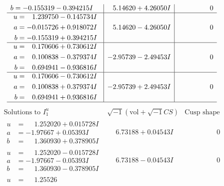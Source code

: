 \documentclass[1p]{elsarticle_modified}
\theoremstyle{definition}
\newcommand{\I}{\sqrt{-1}}
\begin{document}
$$\begin{array}{c|c|c}
\begin{aligned}
b &= -0.155319 - 0.394215 I\end{aligned}
 & \phantom{-}5.14620 + 4.26050 I & \phantom{-0.000000 } 0 \\ \hline\begin{aligned}
u &= \phantom{-}1.239750 - 0.145734 I \\
a &= -0.015726 + 0.918072 I \\
b &= -0.155319 + 0.394215 I\end{aligned}
 & \phantom{-}5.14620 - 4.26050 I & \phantom{-0.000000 } 0 \\ \hline\begin{aligned}
u &= \phantom{-}0.170606 + 0.730612 I \\
a &= \phantom{-}0.100838 - 0.379374 I \\
b &= \phantom{-}0.694941 - 0.936816 I\end{aligned}
 & -2.95739 - 2.49453 I & \phantom{-0.000000 } 0 \\ \hline\begin{aligned}
u &= \phantom{-}0.170606 - 0.730612 I \\
a &= \phantom{-}0.100838 + 0.379374 I \\
b &= \phantom{-}0.694941 + 0.936816 I\end{aligned}
 & -2.95739 + 2.49453 I & \phantom{-0.000000 } 0\\
 \hline 
 \end{array}$$\newpage$$\begin{array}{c|c|c}  
\text{Solutions to }I^u_{1}& \I (\text{vol} + \sqrt{-1}CS) & \text{Cusp shape}\\
 \hline 
\begin{aligned}
u &= \phantom{-}1.252020 + 0.015728 I \\
a &= -1.97667 + 0.05393 I \\
b &= \phantom{-}1.360930 + 0.378905 I\end{aligned}
 & \phantom{-}6.73188 + 0.04543 I & \phantom{-0.000000 } 0 \\ \hline\begin{aligned}
u &= \phantom{-}1.252020 - 0.015728 I \\
a &= -1.97667 - 0.05393 I \\
b &= \phantom{-}1.360930 - 0.378905 I\end{aligned}
 & \phantom{-}6.73188 - 0.04543 I & \phantom{-0.000000 } 0 \\ \hline\begin{aligned}
u &= \phantom{-}1.25526\phantom{ +0.000000I} \\

\end{aligned}
\end{array}$$
\end{document}
